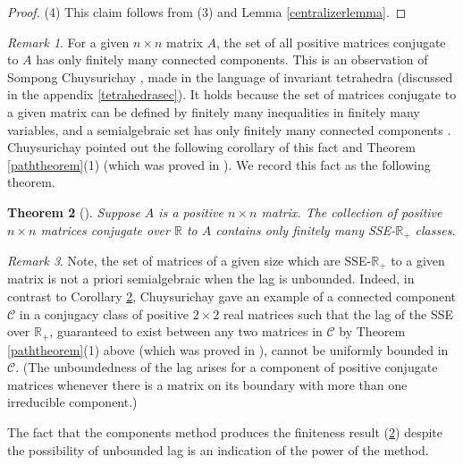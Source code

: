\documentclass{amsart}
\newtheorem{theorem}{Theorem}[section]
\theoremstyle{definition}
\theoremstyle{remark}
\newtheorem{remark}[theorem]{Remark}
\numberwithin{equation}{section}
\begin{document}
{{\begin{proof}
(4) 
This claim follows from (3) and 
Lemma \ref{centralizerlemma}.
\end{proof} 

\begin{remark}\label{finitelymanycomponents}
 For a given  $n\times n$ matrix 
$A$, the set of all positive matrices conjugate to $A$ 
has only finitely many connected components. This is 
an observation of Sompong  Chuysurichay 
\cite[Theorem 1.4.2]{Ch},  
made in the language of 
invariant tetrahedra (discussed in the appendix \ref{tetrahedrasec}).
It holds because  the set of matrices conjugate to a given matrix 
can be defined by finitely many inequalities in finitely 
many variables,
and  a semialgebraic set has only finitely many connected 
components \cite[Theorem 2.4.4]{BCR98}.
Chuysurichay
\cite[Introduction]{Ch} 
 pointed out the following corollary of this 
fact and Theorem \ref{paththeorem}(1) (which was proved in 
\cite{KR2}). We record this fact as the following theorem.  
\end{remark} 

\begin{theorem}[\cite{Ch,KR2}]\label{finitesse}  Suppose $A$ is a positive $n\times n$ 
matrix. The collection of positive $n\times n$ matrices 
conjugate over $\mathbb R$ to $A$ contains  only finitely many 
SSE-$\mathbb R_+$ classes. 
\end{theorem} 

\begin{remark} \label{unboundedlag} 
Note, the set of matrices  of a given size which are 
 SSE-$\mathbb R_+$  to a given matrix is not a priori 
semialgebraic when the lag is unbounded. Indeed, 
in contrast to Corollary \ref{finitesse}, 
Chuysurichay 
gave an example
\cite[Theorem 1.9.1]{Ch} 
 of a connected 
component $\mathcal C$ in a conjugacy class of  
 positive $2\times 2$ real matrices 
such that the lag of the SSE over $\mathbb R_+$, guaranteed to 
exist between any two  matrices in $\mathcal C$  
by Theorem \ref{paththeorem}(1) above
 (which was proved in \cite{KR2}),  cannot be uniformly bounded 
in $\mathcal C$. (The unboundedness of the lag 
arises for a component of positive conjugate matrices 
whenever there is a matrix on its boundary with more 
than one irreducible component.) 

The fact that the components method produces the finiteness 
result (\ref{finitesse}) despite the possibility of unbounded 
lag is an indication of the power of the method. 
\end{remark} 

}}
\end{document}
